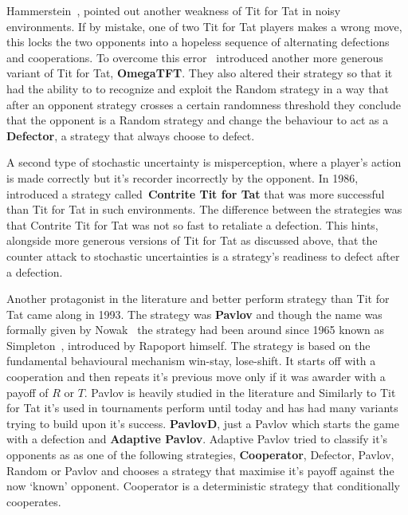 \documentclass{article}
\theoremstyle{definition}
\begin{document}
Hammerstein~\cite{Hammerstein1984}, pointed out another weakness of Tit
for Tat in noisy environments. If by mistake, one of two Tit for Tat players makes a wrong move,
this locks the two opponents into a hopeless sequence of alternating defections
and cooperations. To overcome this error~\cite{Wolfgang2006} introduced another more
generous variant of Tit for Tat, \textbf{OmegaTFT}. They also altered their strategy
so that it had the ability to
to recognize and exploit the Random strategy in a way that after an opponent
strategy crosses a certain randomness threshold they conclude that the opponent is
a Random strategy and change the behaviour to act as a \textbf{Defector}, a strategy that
always choose to defect.

A second type of stochastic uncertainty is misperception, where a player's action is made correctly
but it's recorder incorrectly by the opponent. In 1986,~\cite{Sugden2004} introduced
a strategy called~\textbf{Contrite Tit for Tat} that was more successful than Tit
for Tat in such environments. The difference between the strategies was that
Contrite Tit for Tat was not so fast to retaliate a defection. This hints, alongside
more generous versions of Tit for Tat as discussed above, that the counter attack
to stochastic uncertainties is a strategy's readiness to defect after a defection.

Another protagonist in the literature and better perform strategy than Tit for Tat
came along in 1993. The strategy was \textbf{Pavlov} and though the name was
formally given  by Nowak~\cite{Nowak1993} the strategy had been around since 1965
known as Simpleton~\cite{rapoport1965}, introduced by Rapoport himself.
The strategy is based on the fundamental
behavioural mechanism win-stay, lose-shift. It starts off with a cooperation and
then repeats it's previous move only if it was awarder with a payoff of \(R\) or
\(T\). Pavlov is heavily studied in the literature and Similarly to Tit for Tat
it's used in tournaments perform until today and has had many variants trying
to build upon it's success. \textbf{PavlovD}, just a Pavlov which starts the game
with a defection and \textbf{Adaptive Pavlov}. Adaptive Pavlov tried to
classify it's opponents as as one of the following strategies, \textbf{Cooperator}, Defector,
Pavlov, Random or Pavlov and chooses a strategy that maximise it's payoff against
the now `known' opponent.
Cooperator is a deterministic strategy that conditionally cooperates.

\end{document}
